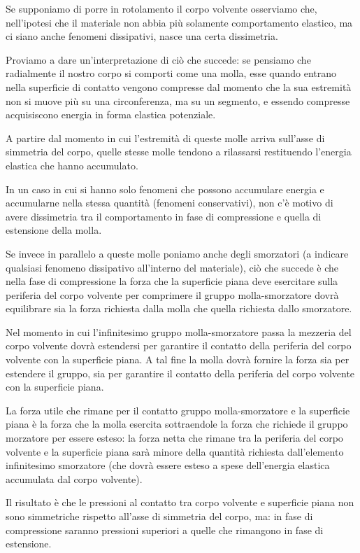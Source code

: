 Se supponiamo di porre in rotolamento il corpo volvente osserviamo che, nell'ipotesi che il materiale non abbia più solamente comportamento elastico, ma ci siano anche fenomeni dissipativi, nasce una certa dissimetria.

Proviamo a dare un'interpretazione di ciò che succede: se pensiamo che radialmente il nostro corpo si comporti come una molla, esse quando entrano nella superficie di contatto vengono compresse dal momento che la sua estremità non si muove più su una circonferenza, ma su un segmento, e essendo compresse acquisiscono energia in forma elastica potenziale.

A partire dal momento in cui l'estremità di queste molle arriva sull'asse di simmetria del corpo, quelle stesse molle tendono a rilassarsi restituendo l'energia elastica che hanno accumulato.

In un caso in cui si hanno solo fenomeni che possono accumulare energia e accumularne nella stessa quantità (fenomeni conservativi), non c'è motivo di avere dissimetria tra il comportamento in fase di compressione e quella di estensione della molla.

Se invece in parallelo a queste molle poniamo anche degli smorzatori (a indicare qualsiasi fenomeno dissipativo all'interno del materiale), ciò che succede è che nella fase di compressione la forza che la superficie piana deve esercitare sulla periferia del corpo volvente per comprimere il gruppo molla-smorzatore dovrà equilibrare sia la forza richiesta dalla molla che quella richiesta dallo smorzatore.

Nel momento in cui l'infinitesimo gruppo molla-smorzatore passa la mezzeria del corpo volvente dovrà estendersi per garantire il contatto della periferia del corpo volvente con la superficie piana. A tal fine la molla dovrà fornire la forza sia per estendere il gruppo, sia per garantire il contatto della periferia del corpo volvente con la superficie piana.

La forza utile che rimane per il contatto gruppo molla-smorzatore e la superficie piana è la forza che la molla esercita sottraendole la forza che richiede il gruppo morzatore per essere esteso: la forza netta che rimane tra la periferia del corpo volvente e la superficie piana sarà minore della quantità richiesta dall'elemento infinitesimo smorzatore (che dovrà essere esteso a spese dell'energia elastica accumulata dal corpo volvente).

Il risultato è che le pressioni al contatto tra corpo volvente e superficie piana non sono simmetriche rispetto all'asse di simmetria del corpo, ma: in fase di compressione saranno pressioni superiori a quelle che rimangono in fase di estensione.


